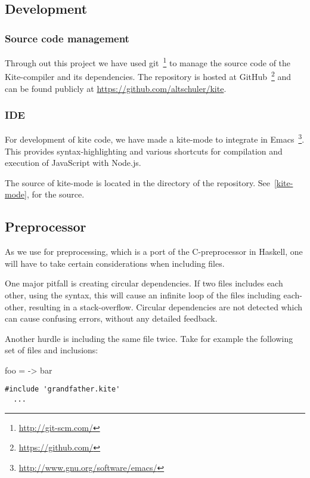 
\subsection{Development}
\subsubsection{Source code management}
Through out this project we have used git~\footnote{\url{http://git-scm.com/}} to manage the source code of the Kite-compiler and its dependencies. The repository is hosted at GitHub~\footnote{\url{https://github.com/}} and can be found publicly at \url{https://github.com/altschuler/kite}.

\subsubsection{IDE}
For development of kite code, we have made a kite-mode to integrate in Emacs~\footnote{\url{http://www.gnu.org/software/emacs/}}. This provides syntax-highlighting and various shortcuts for compilation and execution of JavaScript with Node.js.

The source of kite-mode is located in the  directory of the repository. See~\ref{kite-mode}, for the source.


\subsection{Preprocessor}
As we use \cite{wallace04} for preprocessing, which is a port of the C-preprocessor in Haskell, one will have to take certain considerations when including files.

One major pitfall is creating circular dependencies. If two files includes each other, using the  syntax, this will cause an infinite loop of the files including each-other, resulting in a stack-overflow. Circular dependencies are not detected which can cause confusing errors, without any detailed feedback.

Another hurdle is including the same file twice. Take for example the following set of files and inclusions:

\begin{kite}[caption=\code{grandfather.kite}]
  foo = -> { bar }
\end{kite}

\begin{lstlisting}[caption=\code{father.kite}]
  #include 'grandfather.kite'
  ...
\end{lstlisting}

